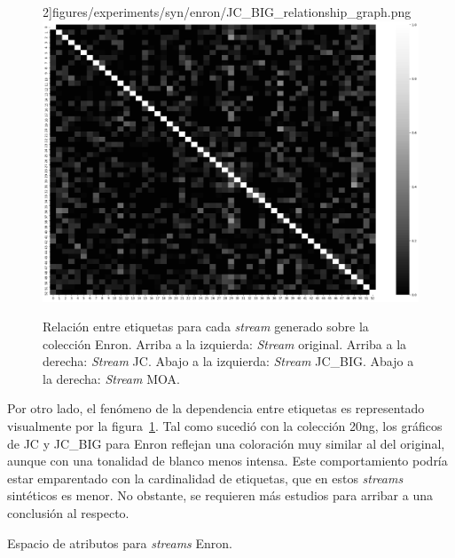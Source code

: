 \begin{figure}[htbp]
		2]{figures/experiments/syn/enron/JC_BIG_relationship_graph.png}
	\includegraphics[width=\linewidth /
		2]{figures/experiments/syn/enron/MOA_relationship_graph.png}
	\caption[Relación entre etiquetas para cada \textit{stream} generado sobre
		la colección Enron.]{Relación entre etiquetas para cada \textit{stream} generado sobre
		la colección Enron. Arriba a la izquierda: \textit{Stream} original. Arriba a la
		derecha: \textit{Stream} JC. Abajo a la izquierda: \textit{Stream}
		JC\_BIG. Abajo a la derecha: \textit{Stream} MOA.}
	\label{fig:syn_enron_label_relationship}
\end{figure}

Por otro lado, el fenómeno de la dependencia entre etiquetas es representado
visualmente por la figura~\ref{fig:syn_enron_label_relationship}. Tal como
sucedió con la colección 20ng, los gráficos de JC y JC\_BIG para Enron reflejan
una coloración muy similar al del original, aunque con una tonalidad de blanco
menos intensa. Este comportamiento podría estar emparentado con la cardinalidad
de etiquetas, que en estos \textit{streams} sintéticos es menor. No obstante, se
requieren más estudios para arribar a una conclusión al respecto.

\begin{table}[htbp]
	\centering
	\begin{adjustbox}{max width=\textwidth}
		
	\end{adjustbox}
	\caption{Espacio de atributos para \textit{streams} Enron.}
	\label{tab:syn_enron_features_space}
\end{table}


